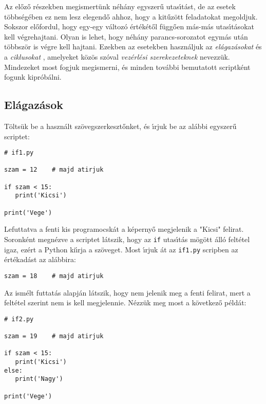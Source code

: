 \documentclass[12pt]{article}
\newcounter{feladat}
\newcounter{megold}
\begin{document}
Az el\H{o}z\H{o} r\'eszekben megismert\"unk n\'eh\'any egyszer\H{u} utas\'{\i}t\'ast, de az esetek 
t\"obbs\'e\-g\'eb\-en ez nem lesz elegend\H{o} ahhoz, hogy a kit\H{u}z\"ott feladatokat megoldjuk. Sokszor 
el\H{o}fordul, hogy egy-egy v\'altoz\'o \'ert\'ek\'et\H{o}l f\"ugg\H{o}en m\'as-m\'as utas\'{\i}t\'asokat 
kell v\'egrehajtani. O\-lyan is lehet, hogy n\'eh\'any parancs-sorozatot egym\'as ut\'an t\"obbsz\"or is 
v\'egre kell hajtani. Ezekben az esetekben haszn\'aljuk az {\sl el\'agaz\'asokat}  
\'es a {\sl ciklusokat} , 
amelyeket k\"oz\"os sz\'oval {\sl vez\'erl\'esi szerekezeteknek} nevezz\"uk. Mindezeket most fogjuk megismerni, 
\'es minden tov\'abbi bemutatott scriptk\'ent fogunk kipr\'ob\'alni.

\subsection{El\'agaz\'asok}

T\"olts\"uk be a haszn\'alt sz\"ovegszerkeszt\H{o}nket, \'es \'{\i}rjuk be az al\'abbi egyszer\H{u} scriptet: 

\begin{Verbatim}[fontsize=\small]
# if1.py

szam = 12    # majd atirjuk

if szam < 15:
   print('Kicsi')

print('Vege')
\end{Verbatim}

Lefuttatva a fenti kis programocsk\'at a k\'eperny\H{o} megjelenik a "Kicsi" felirat. Soronk\'ent megn\'ezve 
a scriptet l\'atszik, hogy az {\tt if} utas\'{\i}t\'as m\"og\"ott \'all\'o felt\'etel igaz, ez\'ert a Python 
ki\'{\i}rja a sz\"oveget. Most \'{\i}rjuk \'at az {\tt if1.py} scripben az \'ert\'ekad\'ast az al\'abbira:

\begin{Verbatim}[fontsize=\small]
szam = 18    # majd atirjuk
\end{Verbatim}

Az ism\'elt futtat\'as alapj\'an l\'atszik, hogy nem jelenik meg a fenti felirat, mert a felt\'etel szerint 
nem is kell megjelennie. N\'ezz\"uk meg most a k\"ovetkez\H{o} p\'eld\'at:

\begin{Verbatim}[fontsize=\small]
# if2.py

szam = 19    # majd atirjuk

if szam < 15:
   print('Kicsi')
else:
   print('Nagy')

print('Vege')
\end{Verbatim}
\end{document}
